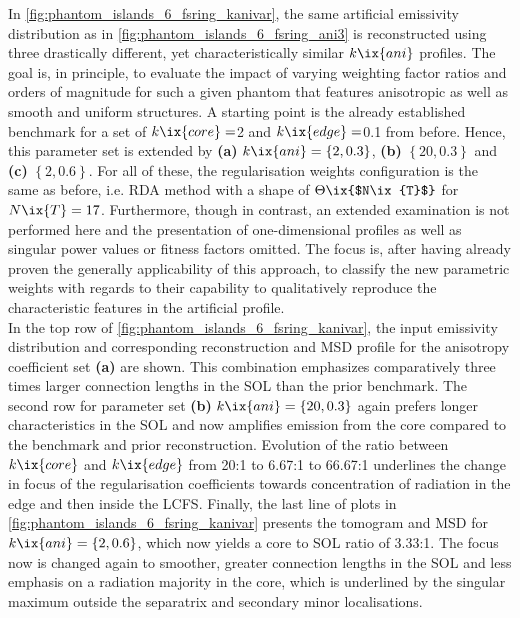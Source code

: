 %
                In \cref{fig:phantom_islands_6_fsring_kanivar}, the same artificial emissivity distribution as in \cref{fig:phantom_islands_6_fsring_ani3} is reconstructed using three drastically different, yet characteristically similar $k\ix{ani}$ profiles. The goal is, in principle, to evaluate the impact of varying weighting factor ratios and orders of magnitude for such a given phantom that features anisotropic as well as smooth and uniform structures. A starting point is the already established benchmark for a set of $k\ix{core}=$\SI{2}{\arbitraryunit} and $k\ix{edge}=$\SI{0.1}{\arbitraryunit} from before. Hence, this parameter set is extended by \textbf{(a)} $k\ix{ani}=\left\{2, 0.3\right\}$, \textbf{(b)} $\left\{20, 0.3\right\}$ and \textbf{(c)} $\left\{2, 0.6\right\}$. For all of these, the regularisation weights configuration is the same as before, i.e. RDA method with a shape of $\Theta\ix{$N\ix{T}$}$ for $N\ix{T}=17$. Furthermore, though in contrast, an extended examination is not performed here and the presentation of one-dimensional profiles as well as singular power values or fitness factors omitted. The focus is, after having already proven the generally applicability of this approach, to classify the new parametric weights with regards to their capability to qualitatively reproduce the characteristic features in the artificial profile.\\%
                In the top row of \cref{fig:phantom_islands_6_fsring_kanivar}, the input emissivity distribution and corresponding reconstruction and MSD profile for the anisotropy coefficient set \textbf{(a)} are shown. This combination emphasizes comparatively three times larger connection lengths in the SOL than the prior benchmark. The second row for parameter set \textbf{(b)} $k\ix{ani}=\left\{20, 0.3\right\}$ again prefers longer characteristics in the SOL and now amplifies emission from the core compared to the benchmark and prior reconstruction. Evolution of the ratio between $k\ix{core}$ and $k\ix{edge}$ from 20:1 to 6.67:1 to 66.67:1 underlines the change in focus of the regularisation coefficients towards concentration of radiation in the edge and then inside the LCFS. Finally, the last line of plots in \cref{fig:phantom_islands_6_fsring_kanivar} presents the tomogram and MSD for $k\ix{ani}=\left\{2, 0.6\right\}$, which now yields a core to SOL ratio of 3.33:1. The focus now is changed again to smoother, greater connection lengths in the SOL and less emphasis on a radiation majority in the core, which is underlined by the singular maximum outside the separatrix and secondary minor localisations.\\%
